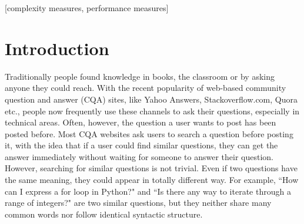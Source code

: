 \documentclass{acm_proc_article-sp}
\begin{document}
\maketitle
\begin{abstract}
This paper provides a sample of a \LaTeX\ document which conforms to
the formatting guidelines for ACM SIG Proceedings.
It complements the document \textit{Author's Guide to Preparing
ACM SIG Proceedings Using \LaTeX$2_\epsilon$\ and Bib\TeX}. This
source file has been written with the intention of being
compiled under \LaTeX$2_\epsilon$\ and BibTeX.

The developers have tried to include every imaginable sort
of ``bells and whistles", such as a subtitle, footnotes on
title, subtitle and authors, as well as in the text, and
every optional component (e.g. Acknowledgments, Additional
Authors, Appendices), not to mention examples of
equations, theorems, tables and figures.

To make best use of this sample document, run it through \LaTeX\
and BibTeX, and compare this source code with the printed
output produced by the dvi file.
\end{abstract}

[complexity measures, performance measures]



\section{Introduction}
Traditionally people found knowledge in books, the classroom or by asking anyone they could reach. With the recent popularity of web-based community question and answer (CQA) sites, like Yahoo Answers, Stackoverflow.com, Quora etc., people now frequently use these channels to ask their questions, especially in technical areas. Often, however, the question a user wants to post has been posted before. Most CQA websites ask users to search a question before posting it, with the idea that if a user could find similar questions, they can get the answer immediately without waiting for someone to answer their question. However, searching for similar questions is not trivial. Even if two questions have the same meaning, they could appear in totally different way.  For example, ``How can I express a for loop in Python?" and ``Is there any way to iterate through a range of integers?" are two similar questions, but they neither share many common words nor follow identical syntactic structure. 
\end{document}
